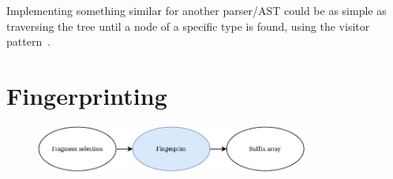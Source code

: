 Implementing something similar for another parser/AST could be as simple as traversing the
tree until a node of a specific type is found, using the visitor
pattern~\cite[366]{GangOfFour}.


\section{Fingerprinting}

\begin{figure}[H]
    \begin{center}
        \includegraphics[width=0.8\textwidth]{figures/phases/phases_fingerprint.drawio.pdf}
    \end{center}
\end{figure}

